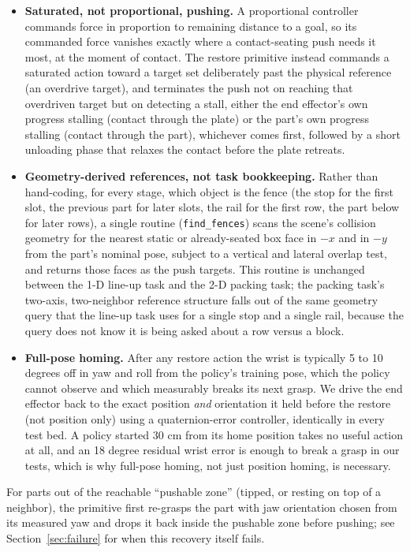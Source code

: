 \documentclass[11pt]{article}
\begin{document}
\begin{itemize}
  \item \textbf{Saturated, not proportional, pushing.} A proportional
  controller commands force in proportion to remaining distance to a goal,
  so its commanded force vanishes exactly where a contact-seating push
  needs it most, at the moment of contact. The restore primitive instead
  commands a saturated action toward a target set deliberately past the
  physical reference (an overdrive target), and terminates the push not on
  reaching that overdriven target but on detecting a stall, either the end
  effector's own progress stalling (contact through the plate) or the
  part's own progress stalling (contact through the part), whichever comes
  first, followed by a short unloading phase that relaxes the contact
  before the plate retreats.
  \item \textbf{Geometry-derived references, not task bookkeeping.} Rather
  than hand-coding, for every stage, which object is the fence (the stop
  for the first slot, the previous part for later slots, the rail for the
  first row, the part below for later rows), a single routine
  (\texttt{find\_fences}) scans the scene's collision geometry for the
  nearest static or already-seated box face in $-x$ and in $-y$ from the
  part's nominal pose, subject to a vertical and lateral overlap test, and
  returns those faces as the push targets. This routine is unchanged
  between the 1-D line-up task and the 2-D packing task; the packing task's
  two-axis, two-neighbor reference structure falls out of the same
  geometry query that the line-up task uses for a single stop and a single
  rail, because the query does not know it is being asked about a row
  versus a block.
  \item \textbf{Full-pose homing.} After any restore action the wrist is
  typically 5 to 10 degrees off in yaw and roll from the policy's training
  pose, which the policy cannot observe and which measurably breaks its
  next grasp. We drive the end effector back to the exact position
  \emph{and} orientation it held before the restore (not position only)
  using a quaternion-error controller, identically in every test bed. A
  policy started 30 cm from its home position takes no useful action at
  all, and an 18 degree residual wrist error is enough to break a grasp in
  our tests, which is why full-pose homing, not just position homing, is
  necessary.
\end{itemize}

For parts out of the reachable ``pushable zone'' (tipped, or resting on top
of a neighbor), the primitive first re-grasps the part with jaw orientation
chosen from its measured yaw and drops it back inside the pushable zone
before pushing; see Section~\ref{sec:failure} for when this recovery itself
fails.
\end{document}
